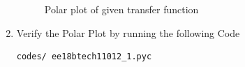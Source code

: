 \begin{enumerate}[label=\thesection.\arabic*.,ref=\thesection.\theenumi]
\begin{figure}
    \caption{Polar plot of given transfer function}
    \label{fig:Graph}
\end{figure}
\item
Verify the Polar Plot by running the following Code\\
\begin{lstlisting}
codes/ ee18btech11012_1.pyc
\end{lstlisting}
\end{enumerate}
